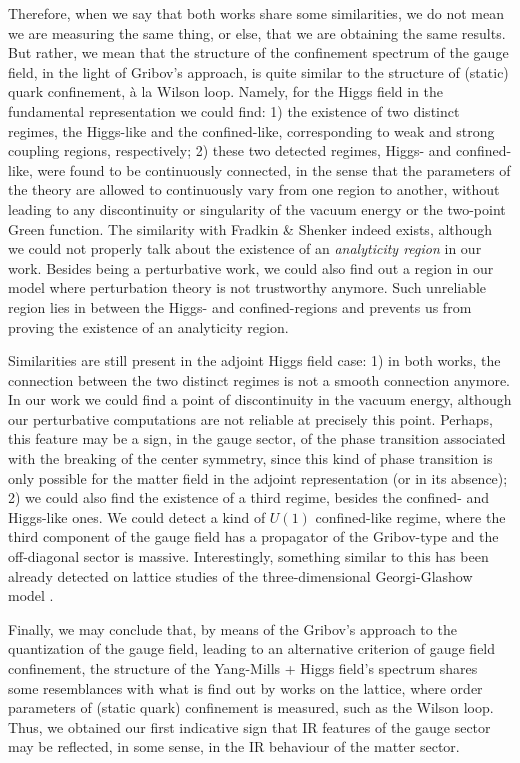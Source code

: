 Therefore, when we say that both works share some similarities, we do not mean we are measuring
the same thing, or else, that we are obtaining the same results. But rather, we mean that the
structure of the confinement spectrum of the gauge field, in the light of Gribov's approach, is
quite similar to the structure of (static) quark confinement, \`a la Wilson loop. Namely, for
the Higgs field in the fundamental representation we could find: 1)
the existence of two distinct regimes, the Higgs-like and the confined-like, corresponding to
weak and strong coupling regions, respectively; 2) these two detected regimes, Higgs- and
confined-like, were found to be continuously connected, in the sense that the parameters of the
theory are allowed to continuously vary from one region to another, without leading to any
discontinuity or singularity of the vacuum energy or the two-point Green function. The
similarity with Fradkin \& Shenker indeed exists, although we could not properly talk about the
existence of an \emph{analyticity region} in our work. Besides being a perturbative work, we
could also find out a region in our model where perturbation theory is not trustworthy anymore.
Such unreliable region lies in between the Higgs- and confined-regions and prevents us from
proving the existence of an analyticity region.

Similarities are still present in the adjoint Higgs field case: 1) in both works, the
connection between the two distinct regimes is not a smooth connection anymore. In our work we
could find a point of discontinuity in the vacuum energy, although our perturbative
computations are not reliable at precisely this point. Perhaps, this feature may be a sign, in
the gauge sector, of the phase transition associated with the breaking of the center symmetry,
since this kind of phase transition is only possible for the matter field in the adjoint
representation (or in its absence);
 2) we could also find the existence of a third regime, besides the confined- and Higgs-like
ones. We could detect a kind of $U(1)$ confined-like regime, where the third component of the
gauge field has a propagator of the Gribov-type and the off-diagonal sector is massive.
Interestingly, something similar to this has been already detected on lattice studies of the
three-dimensional Georgi-Glashow model \cite{Nadkarni:1989na,Hart:1996ac}.

Finally, we may conclude that, by means of the Gribov's approach to the quantization of the
gauge field, leading to an alternative criterion of gauge field confinement, the structure of
the Yang-Mills + Higgs field's spectrum shares some resemblances with what is find out by works
on the lattice, where order parameters of (static quark) confinement is measured, such as the
Wilson loop. Thus, we obtained our first indicative sign that IR features of the gauge sector
may be reflected, in some sense, in the IR behaviour of the matter sector.


